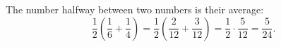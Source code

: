 The number halfway between two numbers is their average:
\[\dfrac12\left(\dfrac16+\dfrac14\right)=\dfrac12\left(\dfrac2{12}+\dfrac3{12}\right)=\dfrac12\cdot\dfrac5{12}=\boxed{\dfrac{5}{24}}.\]
